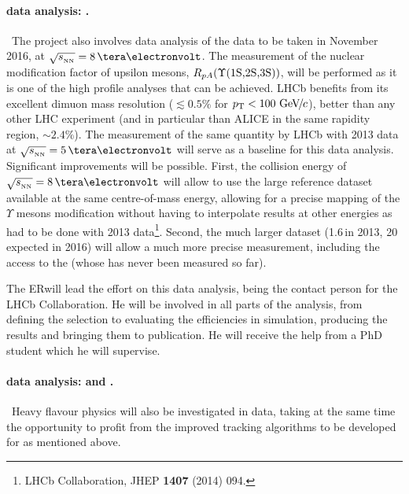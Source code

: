 \documentclass[a4paper,11pt]{article}
\newcommand{\ER}{ER}
\begin{document}
\paragraph{\pPb data analysis: \PgUabc. }\ 
The project also involves data analysis of the \pPb data to be taken in November 2016, at $\sqrtsnn = 8\,\TeV$. The measurement of the nuclear modification factor of upsilon mesons, $R_{pA} (\Upsilon\text{(1S,2S,3S)})$, will be performed as it is one of the high profile analyses that can be achieved. LHCb benefits from its excellent dimuon mass resolution ($\lesssim 0.5\%$ for $p_{\text{T}} < 100\,{\,\text{Ge\hspace{-.08em}V\hspace{-0.16em}/\hspace{-0.08em}}c}$), %
better than any other LHC experiment (and in particular than ALICE in the same rapidity region, $\sim 2.4\%$). %
The measurement of the same quantity by LHCb with 2013 \pPb data at $\sqrtsnn = 5\,\TeV$ will serve as a baseline for this data analysis. Significant improvements will be possible. First, the collision energy of $\sqrtsnn = 8\,\TeV$ will allow to use the large \pp reference dataset available at the same centre-of-mass energy, allowing for a precise mapping of the $\Upsilon$ mesons modification without having to interpolate results at other energies as had to be done with 2013 \pPb data\footnote{LHCb Collaboration,
  JHEP {\bf 1407} (2014) 094.
  }.
Second, the much larger dataset (1.6\,\nbinv in 2013, 20\,\nbinv expected in 2016) will allow a much more precise measurement, including the access to the \PgUc (whose \rpa has never been measured so far).

The \ER will lead the effort on this data analysis, being the contact person for the LHCb Collaboration. He will be involved in all parts of the analysis, from defining the selection to evaluating the efficiencies in simulation, producing the results and bringing them to publication. He will receive the help from a PhD student which he will supervise.


\paragraph{\pbpb data analysis: \Dz and \Jpsi. }\ 
Heavy flavour physics will also be investigated in \pbpb data, taking at the same time the opportunity to profit from the improved tracking algorithms to be developed for \pbpb as mentioned above. 
\end{document}
